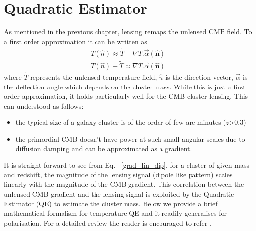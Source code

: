  



\section{Quadratic Estimator}
\label{sec_method}
As mentioned in the previous chapter, lensing remaps the unlensed CMB field. To a first order approximation it can be written as
\begin{eqnarray}
T (\hat{n})\approx \tilde{T}+ \nabla T . \vec{\alpha}(\hat{\textbf{n}}) \\
T (\hat{n}) - \tilde{T} \approx \nabla T . \vec{\alpha}(\hat{\textbf{n}}) 
\label{grad_lin_dip}
\end{eqnarray}
where $ \tilde{T}$ represents the unlensed temperature field, $\hat{n}$ is the direction vector, $\vec{\alpha}$ is the deflection angle which depends on the cluster mass.
While this is just a first order approximation, it holds particularly well for the CMB-cluster lensing. 
This can understood as follows:
\begin{itemize}
\item the typical size of a galaxy cluster is of the order of few arc minutes ($z$>0.3)
\item the primordial CMB doesn't have power at such small angular scales due to diffusion damping \citep{silk68} and can be approximated as a gradient. 
\end{itemize}
It is straight forward to see from Eq. ~\ref{grad_lin_dip}, for a cluster of given mass and redshift, the magnitude of the lensing signal (dipole like pattern) scales linearly with the magnitude of the CMB gradient.
This correlation between the unlensed CMB gradient and the lensing signal is exploited by the Quadratic Estimator (QE) to estimate the cluster mass.
Below we provide a brief mathematical formalism for temperature QE and it readily generalises for polarisation. For a detailed review the reader is encouraged to refer \citet{hu07}.

